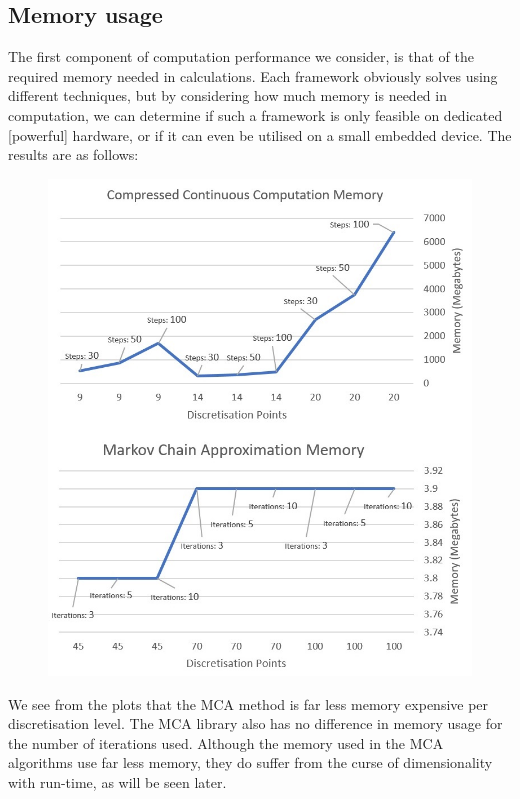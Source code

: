 \documentclass[11pt,draftd]{article}
\begin{document}
\subsection{Memory usage}
The first component of computation performance we consider, is that of the required memory needed in calculations. Each framework obviously solves using different techniques, but by considering how much memory is needed in computation, we can determine if such a framework is only feasible on dedicated [powerful] hardware, or if it can even be utilised on a small embedded device. The results are as follows:
\begin{figure}[H]
	\centering
	\includegraphics[scale=0.6]{images/c3Memory.jpg}
	\caption{}
\end{figure}

We see from the plots that the MCA method is far less memory expensive per discretisation level. The MCA library also has no difference in memory usage for the number of iterations used. Although the memory used in the MCA algorithms use far less memory, they do suffer from the curse of dimensionality with run-time, as will be seen later. \\
\end{document}
